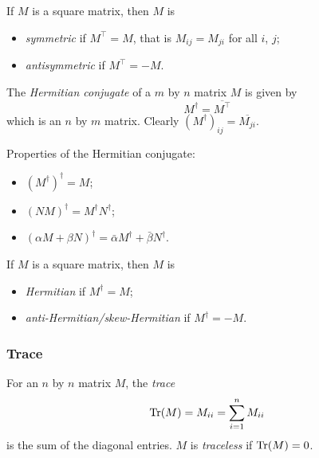 \documentclass{../template/note}
\begin{document}
    \begin{definition}
        If \(M\) is a square matrix, then \(M\) is
        \begin{itemize}
            \item \emph{symmetric} if \(M^\intercal = M\), that is \(M_{ij} = M_{ji}\) for all \(i\), \(j\);
            \item \emph{antisymmetric} if \(M^\intercal = -M\).
        \end{itemize}
    \end{definition}
    
    \begin{definition}
        The \emph{Hermitian conjugate} of a \(m\) by \(n\) matrix \(M\) is given by
        \[
            M^\dagger = \overline{M^\intercal}
        \]
        which is an \(n\) by \(m\) matrix. Clearly \((M^\dagger)_{ij} = \overline{M_{ji}}\).
    \end{definition}
    
    Properties of the Hermitian conjugate:

    \begin{itemize}
        \item \((M^\dagger)^\dagger = M\); 
        \item \((NM)^\dagger = M^\dagger N^\dagger\);
        \item \((\alpha M + \beta N)^\dagger = \bar\alpha M^\dagger + \bar\beta N^\dagger\).
    \end{itemize}
    
    \begin{definition}
        If \(M\) is a square matrix, then \(M\) is
        \begin{itemize}
            \item \emph{Hermitian} if \(M^\dagger = M\);
            \item \emph{anti-Hermitian/skew-Hermitian} if \(M^\dagger = -M\).
        \end{itemize}
    \end{definition}
    
    \subsubsection{Trace}

    \begin{definition}
        For an \(n\) by \(n\) matrix \(M\), the \emph{trace}
        \[
            \operatorname{Tr}(M) = M_{ii} = \sum_{i=1}^n M_{ii}
        \]
        is the sum of the diagonal entries. \(M\) is \emph{traceless} if \(\operatorname{Tr}(M) = 0\).
    \end{definition}
    
\end{document}
